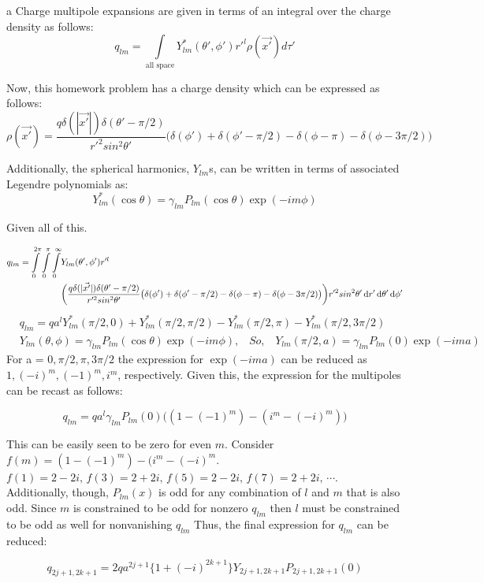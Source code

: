 \begin{homeworkProblem}

\begin{homeworkSection}{a}
Charge multipole expansions are given in terms of an integral over the charge density as follows: \[ q_{lm} = \int\limits_{\text{all space}} Y_{lm}^*(\theta',\phi')r'^l \rho(\vec{x'})d\tau' \]

Now, this homework problem has a charge density which can be expressed as follows: \[ \rho(\vec{x'}) = \frac{q\delta(|\vec{x'}|)\delta(\theta'-\pi/2)}{r'^2sin^2\theta'} \big( \delta(\phi') + \delta(\phi'- \pi/2) - \delta(\phi - \pi) - \delta(\phi - 3\pi/2) \big) \]

Additionally, the spherical harmonics, $Y_{lm}$s, can be written in terms of associated Legendre polynomials as: \[Y_{lm}^*(\cos\theta) = \gamma_{lm}P_{lm}(\cos\theta)\exp(-im\phi) \]

Given all of this.

\begin{align*}
	q_{lm} = \int\limits_0^{2\pi} \int\limits_0^\pi \int\limits_0^\infty& Y_{lm}(\theta',\phi')r'^l \\ &\bigg( \frac{q\delta(|\vec{x'}|)\delta(\theta'-\pi/2)}{r'^2sin^2\theta'} \big( \delta(\phi') + \delta(\phi'- \pi/2) - \delta(\phi - \pi) - \delta(\phi - 3\pi/2) \big) \bigg) r'^2 sin^2\theta' \mathop{}\!\mathrm{d} r' \mathop{}\!\mathrm{d}\theta' \mathop{}\!\mathrm{d}\phi' \\
\end{align*}
\begin{align*}
	 &q_{lm} = q a^l Y_{lm}^*(\pi/2,0)+Y_{lm}^*(\pi/2,\pi/2) -Y_{lm}^*(\pi/2,\pi)-Y_{lm}^*(\pi/2,3\pi/2) \\
   &Y_{lm}(\theta,\phi) = \gamma_{lm} P_{lm}(\cos\theta)\exp(-i m \phi) \textit{,}\quad \textit{So,} \quad Y_{lm}(\pi/2,a) = \gamma_{lm} P_{lm}(0)\exp(-i m a)
\end{align*}
For a = $0,\pi/2,\pi,3\pi/2$ the expression for $\exp(-i m a)$ can be reduced as $1,(-i)^m,(-1)^m,i^m$, respectively. Given this, the expression for the multipoles can be recast as follows:

\[
    q_{lm} = q a^l \gamma_{lm} P_{lm}(0)\big( (1-(-1)^m) - (i^m - (-i)^m) \big)
\]

This can be easily seen to be zero for even $m$. Consider $f(m) =  (1-(-1)^m) - (i^m - (-i)^m $. $f(1) = 2-2i,\, f(3) = 2+2i,\, f(5) = 2-2i,\, f(7) = 2+2i,\, \cdots$. Additionally, though, $P_{lm}(x)$ is odd for any combination of $l$ and $m$ that is also odd. Since $m$ is constrained to be odd for nonzero $q_{lm}$ then $l$ must be constrained to be odd as well for nonvanishing $q_{lm}$ Thus, the final expression for $q_{lm}$ can be reduced:

\[
	q_{2j+1,2k+1} = 2q a^{2j+1} \big\{ 1+(-i)^{2k+1} \big\}Y_{2j+1,2k+1}P_{2j+1,2k+1}(0)
\]
\end{homeworkSection}

\end{homeworkProblem}